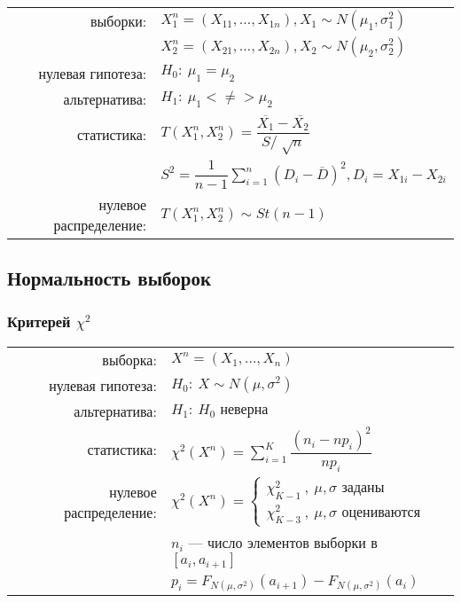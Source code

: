 \documentclass[a4paper,12pt]{article}
\begin{document}
\begin{table}[h]
	\begin{tabular}{rl}
выборки:& $ X^{n}_{1} = \left( X_{11}, \ldots, X_{1n} \right), X_{1} \sim N( \mu_{1}, \sigma^{2}_{1}) $ \\
       & $ X^{n}_{2} = \left( X_{21}, \ldots, X_{2n} \right), X_{2} \sim N( \mu_{2}, \sigma^{2}_{2}) $ \\
нулевая гипотеза: & $ H_{0}:~\mu_{1}=\mu_{2} $ \\
альтернатива: & $ H_{1}:~\mu_{1} <\neq> \mu_{2} $ \\
статистика: & $ T \left( X^{n}_{1}, X^{n}_{2} \right) = \dfrac{\overline{X_{1}}-\overline{X_{2}}}{S/\sqrt[]{n}} $ \\
       & $ S^{2} = \dfrac{1}{n-1} \sum \limits_{i=1}^{n}\left( D_{i} - \overline{D} \right)^{2}, D_{i} = X_{1i}-X_{2i} $ \\
нулевое распределение: & $ T\left( X^{n}_{1}, X^{n}_{2} \right) \sim St(n-1) $
	\end{tabular}
\end{table}

\subsection{Нормальность выборок}

\subsubsection{Критерей $\chi^2$}

\begin{table}[h]
	\begin{tabular}{rl}
выборка:& $ X^{n} = \left( X_{1}, \ldots, X_{n} \right) $ \\
нулевая гипотеза: & $ H_{0}:~X \sim N( \mu, \sigma^{2}) $ \\
альтернатива: & $ H_{1}:~H_{0}\text{ неверна} $ \\
статистика: & $ \chi^{2}\left( X^{n} \right) = \sum\limits_{i=1}^{K}\dfrac{(n_{i} - np_{i})^2}{np_{i}} $ \\
нулевое распределение: & $ \chi^{2}\left( X^{n} \right) =
	\begin{cases}
		\chi_{K-1}^{2}~,~\mu,\sigma\text{ заданы} \\
        \chi_{K-3}^{2}~,~\mu,\sigma\text{ оцениваются}
	\end{cases} $ \\
	& $ n_{i} $ --- число элементов выборки в $ [a_{i}, a_{i+1}] $ \\
    & $ p_{i} = F_{N(\mu,\sigma^{2})}(a_{i+1}) - F_{N(\mu,\sigma^{2})}(a_i) $
    \end{tabular}
\end{table}
\end{document}
